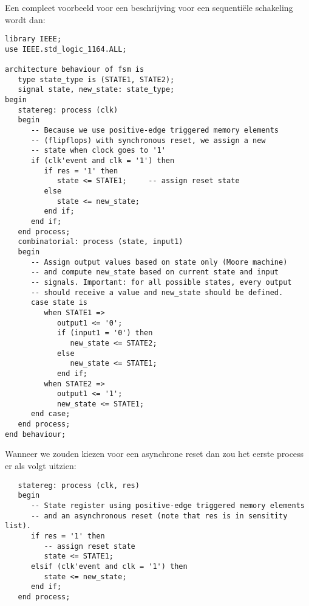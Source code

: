Een compleet voorbeeld voor een beschrijving voor een 
sequenti\"ele schakeling wordt dan:
\begin{verbatim}
library IEEE;
use IEEE.std_logic_1164.ALL;

architecture behaviour of fsm is
   type state_type is (STATE1, STATE2);
   signal state, new_state: state_type;
begin     
   statereg: process (clk)
   begin
      -- Because we use positive-edge triggered memory elements 
      -- (flipflops) with synchronous reset, we assign a new 
      -- state when clock goes to '1' 
      if (clk'event and clk = '1') then
         if res = '1' then
            state <= STATE1;     -- assign reset state
         else
            state <= new_state;
         end if;
      end if;
   end process;
   combinatorial: process (state, input1)
   begin
      -- Assign output values based on state only (Moore machine)
      -- and compute new_state based on current state and input 
      -- signals. Important: for all possible states, every output 
      -- should receive a value and new_state should be defined.
      case state is
         when STATE1 =>
            output1 <= '0';
            if (input1 = '0') then
               new_state <= STATE2;
            else  
               new_state <= STATE1;
            end if;
         when STATE2 =>
            output1 <= '1';
            new_state <= STATE1;
      end case;
   end process;
end behaviour;
\end{verbatim}

Wanneer we zouden kiezen voor een asynchrone reset dan
zou het eerste process er als volgt uitzien:
\begin{verbatim}
   statereg: process (clk, res)
   begin
      -- State register using positive-edge triggered memory elements
      -- and an asynchronous reset (note that res is in sensitity list).
      if res = '1' then
         -- assign reset state
         state <= STATE1;
      elsif (clk'event and clk = '1') then
         state <= new_state;
      end if;
   end process;
\end{verbatim}

